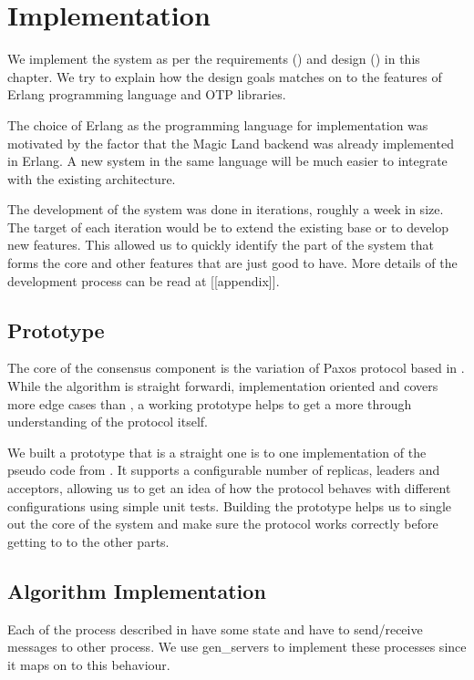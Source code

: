 \chapter{Implementation}
\label{chapter:implementation}

We implement the system as per the requirements () and
design () in this chapter. We try to explain how the
design goals matches on to the features of Erlang \citep{erlang} programming
language and OTP libraries.

The choice of Erlang as the programming language for implementation was
motivated by the factor that the Magic Land backend was already implemented in
Erlang. A new system in the same language will be much easier to integrate with
the existing architecture.

The development of the system was done in iterations, roughly a week in size.
The target of each iteration would be to extend the existing base or to develop
new features. This allowed us to quickly identify the part of the system that
forms the core and other features that are just good to have. More details of
the development process can be read at [[appendix]].

\section{Prototype}

The core of the consensus component is the variation of Paxos protocol based
in \citet{Robbert2011}. While the algorithm is straight forwardi, implementation
oriented and covers more edge cases than \citet{Lamport01}, a working prototype
helps to get a more through understanding of the protocol itself.

We built a prototype that is a straight one is to one implementation of the
pseudo code from \citet{Robbert2011}. It supports a configurable number of
replicas, leaders and acceptors, allowing us to get an idea of how the protocol
behaves with different configurations using simple unit tests. Building the
prototype helps us to single out the core of the system and make sure the
protocol works correctly before getting to to the other parts.

\section{Algorithm Implementation}

Each of the process described in  have some state
and have to send/receive messages to other process. We use gen\_servers
 to implement these processes since it maps on to
this behaviour.

